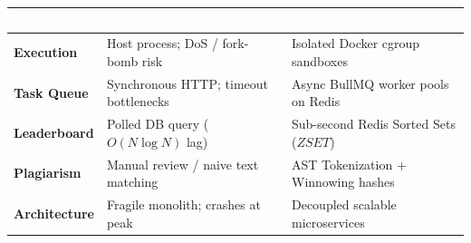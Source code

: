\documentclass[10pt]{article}
\begin{document}
\begin{minipage}[t]{0.492\textwidth}
  \begin{tcolorbox}[
    equal height group=row3,
    colback=compbg, colframe=compframe,
    title={\textbf{\color{comptitle}Existing vs Proposed System}},
    fonttitle=\fontsize{8.5}{10}\selectfont,
    coltitle=comptitle, colbacktitle=compbg,
    boxrule=0.7pt, arc=1.5mm,
    top=2.5pt, bottom=2.5pt, left=2.5pt, right=2.5pt, toptitle=1pt, bottomtitle=1pt
  ]
  \fontsize{6.8}{8.0}\selectfont
  \renewcommand{\arraystretch}{1.14}
  \setlength{\tabcolsep}{3pt}
  \begin{tabularx}{\linewidth}{|>{\raggedright\arraybackslash\bfseries}p{1.7cm}|>{\raggedright\arraybackslash}X|>{\raggedright\arraybackslash}X|}
    \hline
    \rowcolor{tblheader}
    \textcolor{white}{\textbf{Feature}} & \textcolor{white}{\textbf{Existing System}} & \textcolor{white}{\textbf{Proposed System}} \\ \hline
    \textbf{Execution} & Host process; DoS / fork-bomb risk & Isolated Docker cgroup sandboxes \\ \hline
    \textbf{Task Queue} & Synchronous HTTP; timeout bottlenecks & Async BullMQ worker pools on Redis \\ \hline
    \textbf{Leaderboard} & Polled DB query ($O(N \log N)$ lag) & Sub-second Redis Sorted Sets ($ZSET$) \\ \hline
    \textbf{Plagiarism} & Manual review / naive text matching & AST Tokenization + Winnowing hashes \\ \hline
    \textbf{Architecture} & Fragile monolith; crashes at peak & Decoupled scalable microservices \\ \hline
  \end{tabularx}
  \end{tcolorbox}

  \vspace{1.5mm}


\end{minipage}
\end{document}
